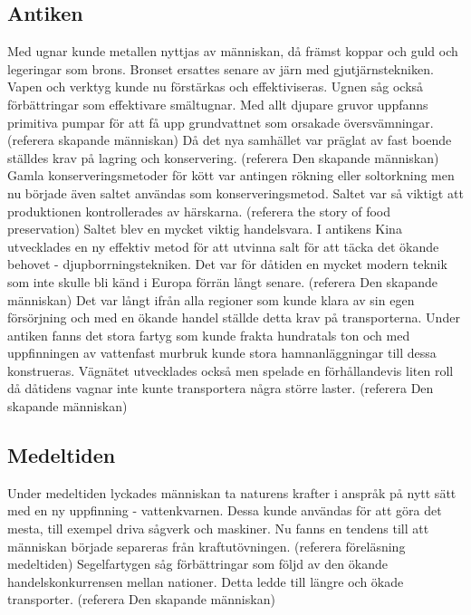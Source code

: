 \subsection{Antiken}
Med ugnar kunde metallen nyttjas av människan, då främst koppar och guld och legeringar som brons. Bronset ersattes senare av järn med gjutjärnstekniken. Vapen och verktyg kunde nu förstärkas och effektiviseras. Ugnen såg också förbättringar som effektivare smältugnar. Med allt djupare gruvor uppfanns primitiva pumpar för att få upp grundvattnet som orsakade översvämningar. (referera skapande människan)
\newline
\newline 
Då det nya samhället var präglat av fast boende ställdes krav på lagring och konservering. (referera Den skapande människan)
\newline
\newline
Gamla konserveringsmetoder för kött var antingen rökning eller soltorkning men nu började även saltet användas som konserveringsmetod. Saltet var så viktigt att produktionen kontrollerades av härskarna. 
(referera the story of food preservation) 
\newline
\newline
Saltet blev en mycket viktig handelsvara. I antikens Kina utvecklades en ny effektiv metod för att utvinna salt för att täcka det ökande behovet - djupborrningstekniken. Det var för dåtiden en mycket modern teknik som inte skulle bli känd i Europa förrän långt senare. (referera Den skapande människan)
\newline
\newline
Det var långt ifrån alla regioner som kunde klara av sin egen försörjning och med en ökande handel ställde detta krav på transporterna. Under antiken fanns det stora fartyg som kunde frakta hundratals ton och med uppfinningen av vattenfast murbruk kunde stora hamnanläggningar till dessa konstrueras. Vägnätet utvecklades också men spelade en förhållandevis liten roll då dåtidens vagnar inte kunte transportera några större laster. (referera Den skapande människan)

\subsection{Medeltiden}    
Under medeltiden lyckades människan ta naturens krafter i anspråk på nytt sätt med en ny uppfinning - vattenkvarnen. Dessa kunde användas för att göra det mesta, till exempel driva sågverk och maskiner. Nu fanns en tendens till att människan började separeras från kraftutövningen. (referera föreläsning medeltiden) 
\newline
\newline
Segelfartygen såg förbättringar som följd av den ökande handelskonkurrensen mellan nationer. Detta ledde till längre och ökade transporter. (referera Den skapande människan)

